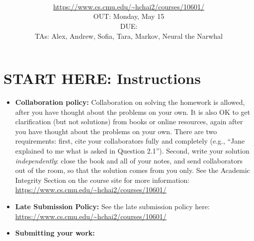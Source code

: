 \documentclass[11pt,addpoints,answers]{exam}
\title{\textsc{\hwName}
} %
\author{\courseName\\
\url{https://www.cs.cmu.edu/~hchai2/courses/10601/} \\
OUT: Monday, May 15 \\
DUE: \dueDate{} \\ 
TAs: Alex, Andrew, Sofia, Tara, Markov, Neural the Narwhal
}
\date{}
\date{}
\begin{document}
\maketitle

\section*{START HERE: Instructions}
\begin{itemize}
\item \textbf{Collaboration policy:} Collaboration on solving the homework is allowed, after you have thought about the problems on your own. It is also OK to get clarification (but not solutions) from books or online resources, again after you have thought about the problems on your own. There are two requirements: first, cite your collaborators fully and completely (e.g., ``Jane explained to me what is asked in Question 2.1''). Second, write your solution {\em independently}: close the book and all of your notes, and send collaborators out of the room, so that the solution comes from you only.  See the Academic Integrity Section on the course site for more information: \url{https://www.cs.cmu.edu/~hchai2/courses/10601/}

\item\textbf{Late Submission Policy:} See the late submission policy here: \url{https://www.cs.cmu.edu/~hchai2/courses/10601/}

\item\textbf{Submitting your work:} 

\begin{itemize}



\end{itemize}
\end{itemize}
\end{document}

